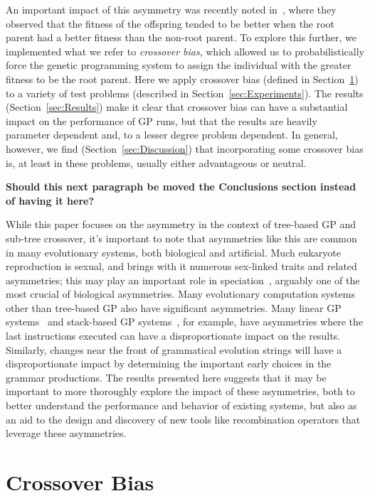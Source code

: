 \documentclass{sig-alternate}
\begin{document}
An important impact of this asymmetry was recently noted in~\cite{McPheeDonatucciDramdahl:2014},
where they observed that the fitness of the offspring tended to be better when the root parent had a better 
fitness than
the non-root parent.
To explore this further, we implemented what we refer to \emph{crossover bias}, which allowed us to
probabilistically force the genetic programming system to assign the individual with the greater 
fitness to be the root parent. Here we apply crossover bias (defined in Section~\ref{sec:XObias}) 
to a variety of test problems (described in Section~\ref{sec:Experiments}). The results 
(Section~\ref{sec:Results}) make it clear that crossover bias can have a substantial impact on the 
performance of GP runs, but that the results are heavily parameter dependent and, to a lesser degree 
problem dependent. In general, however, we find (Section~\ref{sec:Discussion}) that incorporating 
some crossover bias is, at least in these problems, usually either advantageous or neutral. 

\textbf{Should this next paragraph be moved the Conclusions section instead of having it here?}

While this paper focuses on the asymmetry in the context of tree-based GP and sub-tree crossover, it's important to 
note that asymmetries like this are common in many evolutionary systems, both biological and artificial. Much 
eukaryote reproduction is sexual, and brings with it numerous sex-linked traits and related asymmetries; this may
play an important role in speciation~\cite{qvarnstrom2009speciation}, arguably one of the most crucial of 
biological asymmetries.
Many evolutionary computation systems other than tree-based GP also have 
significant asymmetries. Many linear GP systems~\cite{brameier2007linear} and stack-based GP 
systems~\cite{spector:2002:GPEM}, for example, have asymmetries where the last instructions executed can have a 
disproportionate impact on the results. Similarly, changes near the front of grammatical evolution 
\cite{o2003grammatical} strings will have a 
disproportionate impact by determining the important early choices in the grammar productions. 
The results presented here suggests that it may be important to more thoroughly explore the impact of these asymmetries, both to better understand the performance and behavior of existing systems, but also as an aid to the design and discovery of new tools like recombination operators that leverage these asymmetries.

\section{Crossover Bias} \label{sec:XObias}
\end{document}
